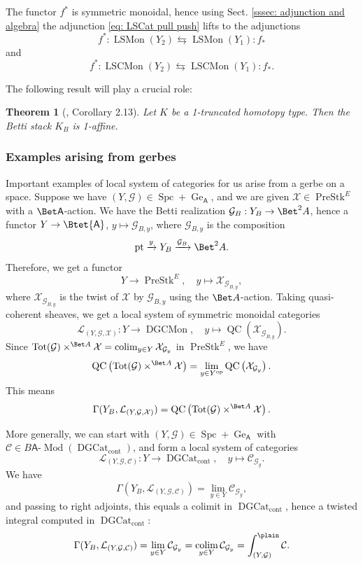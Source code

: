 \documentclass[10pt]{amsart}
\newcommand{\sssec}{\subsubsection}
\newtheorem{thm}[subsubsection]{Theorem}
\theoremstyle{remark}
\newcommand{\on}{\operatorname}
\newcommand{\cC}{\mathcal{C}}
\newcommand{\cG}{\mathcal{G}}
\newcommand{\cL}{\mathcal{L}}
\newcommand{\cX}{\mathcal{X}}
\newcommand{\DGcat}{\on{DGCat}_{\on{cont}}}
\newcommand{\LSMon}{\on{LSMon}}
\newcommand{\LSCMon}{\on{LSCMon}}
\newcommand{\DGCatSymMon}{\on{DGCMon}}
\newcommand{\lMod}{\text{-}\on{Mod}}
\newcommand{\QC}{\on{QC}}
\newcommand{\PreStk}{\on{PreStk}}
\newcommand{\Spc}{\on{Spc}}
\DeclareMathOperator{\op}{op}
\DeclareMathOperator{\colim}{colim}
\newcommand{\pt}{\on{pt}}
\newcommand{\sfA}{\mathsf{A}}
\begin{document}
    The functor $f^*$ is symmetric monoidal, hence using Sect. \ref{sssec: adjunction and algebra} the adjunction \eqref{eq: LSCat pull push} lifts to the adjunctions
    \[f^*:\LSMon(Y_2)\leftrightarrows \LSMon(Y_1):f_*\]
    and
    \[f^*:\LSCMon(Y_2)\leftrightarrows \LSCMon(Y_1):f_*.\]
    
    The following result will play a crucial role:
    \begin{thm}[\cite{PPS}, Corollary 2.13]\label{thm: 1-affineness}
    Let $K$ be a 1-truncated homotopy type. Then the Betti stack $K_B$ is 1-affine.
    \end{thm}


\sssec{Examples arising from gerbes}\label{sssec: examples from gerbes}
Important examples of local system of categories for us arise from a gerbe on a space.
Suppose we have $(Y,\cG)\in\Spc+\on{Ge}_{\sfA}$, and we are given $\cX\in\PreStk^E$ with a $\Bet \sfA$-action. We have the Betti realization
$\cG_B: Y_B\rightarrow \Bet^2 A$, hence a functor
$Y\rightarrow \Btet{\sfA}$, $y\mapsto \cG_{B,y}$,
where $\cG_{B,y}$ is the composition
\[\pt\xrightarrow{y} Y_B\xrightarrow{\cG_B} \Bet^2 A.\]
Therefore, we get a functor
\[Y\rightarrow \PreStk^E,\quad y\mapsto \cX_{\cG_{B,y}},\]
where $\cX_{\cG_{B,y}}$ is the twist of $\cX$ by $\cG_{B,y}$ using the $\Bet A$-action. Taking quasi-coherent sheaves, we get a local system of symmetric monoidal categories
\[\cL_{(Y,\cG,\cX)}:Y\rightarrow \DGCatSymMon,\quad y\mapsto \QC(\cX_{\cG_{B,y}}).\]
Since $\on{Tot}(\cG)\times^{\Bet A}\cX=\colim_{y\in Y} \cX_{\cG_y}$ in $\PreStk^E$,  we have
\[\QC\left(\on{Tot}(\cG)\times^{\Bet A}\cX\right)=\lim_{y\in Y^{\op}} \QC\left(\cX_{\cG_y}\right).\]
This means
\[\Gamma(Y_B, \cL_{(Y,\cG,\cX)})=\QC\left(\on{Tot}(\cG)\times^{\Bet A}\cX\right).\]


More generally, we can start with $(Y,\cG)\in \Spc+\on{Ge}_{\sfA}$ with $\cC\in B\sfA\lMod(\DGcat)$, and form a local system of categories
\begin{equation}\label{eq: LS from gerbe and module}
    \cL_{(Y,\cG,\cC)}: Y\rightarrow \DGcat,\quad y\mapsto \cC_{\cG_y}.
\end{equation}
We have
\[\Gamma(Y_B,  \cL_{(Y,\cG,\cC)})=\lim_{y\in Y} \cC_{\cG_y},\]
and passing to right adjoints, this equals a colimit in $\DGcat$, hence a twisted integral computed in $\DGcat$:
\begin{equation}\label{eq: Gamma of LS form gerbe and module}
    \Gamma(Y_B, \cL_{(Y,\cG,\cC)})=\lim_{y\in Y} \cC_{\cG_y}=
\colim_{y\in Y} \cC_{\cG_y} =\int^{\plain}_{(Y,\cG)}\cC.
\end{equation}
\end{document}
